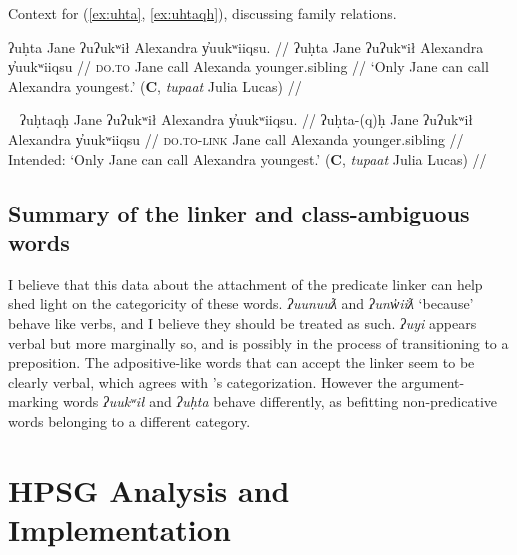 \noindent Context for (\ref{ex:uhta}, \ref{ex:uhtaqh}), discussing family relations.

\ex \label{ex:uhta}
\begingl
\glpreamble ʔuḥta Jane ʔuʔukʷił Alexandra y̓uukʷiiqsu. //
\gla ʔuḥta Jane ʔuʔukʷił Alexandra y̓uukʷiiqsu //
\glb \textsc{do.to} Jane call Alexanda younger.sibling //
\glft `Only Jane can call Alexandra youngest.' (\textbf{C}, \textit{tupaat} Julia Lucas) //
\endgl
\xe

\ex~ \label{ex:uhtaqh}
\begingl
\glpreamble *ʔuḥtaqḥ Jane ʔuʔukʷił Alexandra y̓uukʷiiqsu. //
\gla ʔuḥta-(q)ḥ Jane ʔuʔukʷił Alexandra y̓uukʷiiqsu //
\glb \textsc{do.to}-\textsc{link} Jane call Alexanda younger.sibling //
\glft Intended: `Only Jane can call Alexandra youngest.' (\textbf{C}, \textit{tupaat} Julia Lucas) //
\endgl
\xe

\subsection{Summary of the linker and class-ambiguous words}

I believe that this data about the attachment of the predicate linker can help shed light on the categoricity of these words. \textit{ʔuunuuƛ} and \textit{ʔunw̓iiƛ} `because' behave like verbs, and I believe they should be treated as such. \textit{ʔuyi} appears verbal but more marginally so, and is possibly in the process of transitioning to a preposition. The adpositive-like words that can accept the linker seem to be clearly verbal, which agrees with \cite{woo2007b}'s categorization. However the argument-marking words \textit{ʔuukʷił} and \textit{ʔuḥta} behave differently, as befitting non-predicative words belonging to a different category.

\section{HPSG Analysis and Implementation} \label{sec:link:analysis}

